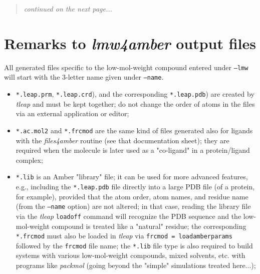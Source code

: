 \documentclass[10pt,landscape,twocolumn]{article}
\begin{document}
\begin{quote}
\textsl{continued on the next page...}
\end{quote}
\newpage

\section{Remarks to \textsl{lmw4amber} output files}\label{libfile}
All generated files specific to the low-mol-weight compound entered under \texttt{--lmw} will start with the 3-letter name given under \texttt{--name}. 

\begin{itemize}

\item \texttt{*.leap.prm}, \texttt{*.leap.crd}), and the corresponding \texttt{*.leap.pdb}) are created by \textsl{tleap} and must be kept together; do not change the order of atoms in the files via an external application or editor;

\item \texttt{*.ac.mol2} and \texttt{*.frcmod} are the same kind of files generated also for ligands with the \textsl{files4amber} routine (see that documentation sheet); they are required when the molecule is later used as a "co-ligand" in a protein/ligand complex;

\item \texttt{*.lib} is an Amber "library" file; it can be used for more advanced features, e.g., including the \texttt{*.leap.pdb} file directly into a large PDB file (of a protein, for example), provided that the atom order, atom names, and residue name (from the \texttt{--name} option) are not altered; in that case, reading the library file via the \textsl{tleap} \texttt{loadoff} command will recognize the PDB sequence and the low-mol-weight compound is treated like a "natural" residue; the corresponding \texttt{*.frcmod} must also be loaded in \textsl{tleap} via \texttt{frcmod = loadamberparams} followed by the \texttt{frcmod} file name; the \texttt{*.lib} file type is also required to build systems with various low-mol-weight compounds, mixed solvents, etc. with programs like \textsl{packmol} (going beyond the "simple" simulations treated here...);

\end{itemize}



 
\end{document}
